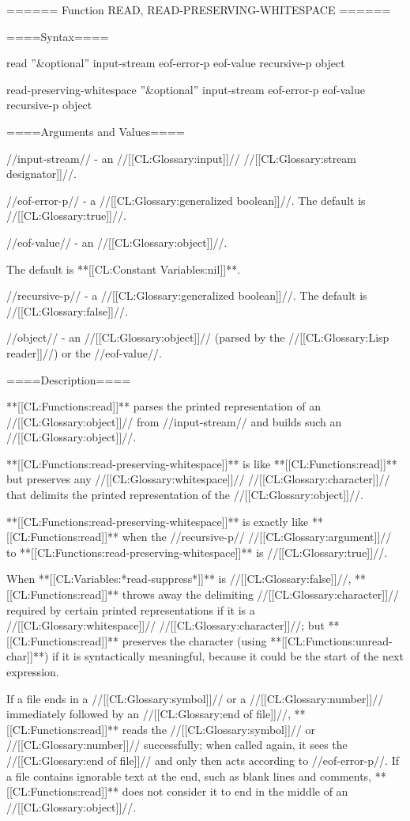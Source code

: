 ====== Function READ, READ-PRESERVING-WHITESPACE ======

====Syntax====

\DefunWithValues read {''&optional'' input-stream eof-error-p eof-value recursive-p} {object}

\DefunWithValuesNewline read-preserving-whitespace {''&optional'' input-stream eof-error-p eof-value recursive-p} {object}

====Arguments and Values====

//input-stream// - an //[[CL:Glossary:input]]// //[[CL:Glossary:stream designator]]//.

//eof-error-p// - a //[[CL:Glossary:generalized boolean]]//. The default is //[[CL:Glossary:true]]//.

//eof-value// - an //[[CL:Glossary:object]]//.

The default is **[[CL:Constant Variables:nil]]**.

//recursive-p// - a //[[CL:Glossary:generalized boolean]]//. The default is //[[CL:Glossary:false]]//.

//object// - an //[[CL:Glossary:object]]// (parsed by the //[[CL:Glossary:Lisp reader]]//) or the //eof-value//.

====Description====

**[[CL:Functions:read]]** parses the printed representation of an //[[CL:Glossary:object]]// from //input-stream// and builds such an //[[CL:Glossary:object]]//.

**[[CL:Functions:read-preserving-whitespace]]** is like **[[CL:Functions:read]]** but preserves any //[[CL:Glossary:whitespace]]// //[[CL:Glossary:character]]// that delimits the printed representation of the //[[CL:Glossary:object]]//.

**[[CL:Functions:read-preserving-whitespace]]** is exactly like **[[CL:Functions:read]]** when the //recursive-p// //[[CL:Glossary:argument]]// to **[[CL:Functions:read-preserving-whitespace]]** is //[[CL:Glossary:true]]//.

When **[[CL:Variables:*read-suppress*]]** is //[[CL:Glossary:false]]//, **[[CL:Functions:read]]** throws away the delimiting //[[CL:Glossary:character]]// required by certain printed representations if it is a //[[CL:Glossary:whitespace]]// //[[CL:Glossary:character]]//; but **[[CL:Functions:read]]** preserves the character (using **[[CL:Functions:unread-char]]**) if it is syntactically meaningful, because it could be the start of the next expression.

If a file ends in a //[[CL:Glossary:symbol]]// or a //[[CL:Glossary:number]]// immediately followed by an //[[CL:Glossary:end of file]]//, **[[CL:Functions:read]]** reads the //[[CL:Glossary:symbol]]// or //[[CL:Glossary:number]]// successfully; when called again, it sees the //[[CL:Glossary:end of file]]// and only then acts according to //eof-error-p//. If a file contains ignorable text at the end, such as blank lines and comments, **[[CL:Functions:read]]** does not consider it to end in the middle of an //[[CL:Glossary:object]]//.

